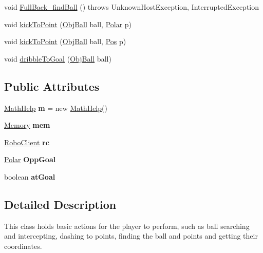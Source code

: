 \begin{DoxyCompactItemize}
\item 
void \hyperlink{classAction_a9e883bc90ec59c4eeb5b0b3dd022b33a}{FullBack\_\-findBall} ()  throws UnknownHostException, InterruptedException 
\item 
void \hyperlink{classAction_ad7308d47f6303c20834dda533d4fe793}{kickToPoint} (\hyperlink{classObjBall}{ObjBall} ball, \hyperlink{classPolar}{Polar} p)
\item 
void \hyperlink{classAction_a639b23a22badac8eb8603bc153daba99}{kickToPoint} (\hyperlink{classObjBall}{ObjBall} ball, \hyperlink{classPos}{Pos} p)
\item 
void \hyperlink{classAction_a87bb8972c15138562c9d05f2a475dda9}{dribbleToGoal} (\hyperlink{classObjBall}{ObjBall} ball)
\end{DoxyCompactItemize}
\subsection*{Public Attributes}
\begin{DoxyCompactItemize}
\item 
\hypertarget{classAction_a7a8b88c7cb187a0d532b9f9bd7507e7b}{
\hyperlink{classMathHelp}{MathHelp} {\bfseries m} = new \hyperlink{classMathHelp}{MathHelp}()}
\label{classAction_a7a8b88c7cb187a0d532b9f9bd7507e7b}

\item 
\hypertarget{classAction_a660d99e264008b78e61f230243c5edde}{
\hyperlink{classMemory}{Memory} {\bfseries mem}}
\label{classAction_a660d99e264008b78e61f230243c5edde}

\item 
\hypertarget{classAction_ad62f59e63c17a404d96ead732c8dca9d}{
\hyperlink{classRoboClient}{RoboClient} {\bfseries rc}}
\label{classAction_ad62f59e63c17a404d96ead732c8dca9d}

\item 
\hypertarget{classAction_a46082e1ed9885927142dc31320c8f2f1}{
\hyperlink{classPolar}{Polar} {\bfseries OppGoal}}
\label{classAction_a46082e1ed9885927142dc31320c8f2f1}

\item 
\hypertarget{classAction_ab9062c12826530e380a93d7bbc8829a5}{
boolean {\bfseries atGoal}}
\label{classAction_ab9062c12826530e380a93d7bbc8829a5}

\end{DoxyCompactItemize}


\subsection{Detailed Description}
This class holds basic actions for the player to perform, such as ball searching and intercepting, dashing to points, finding the ball and points and getting their coordinates. 

